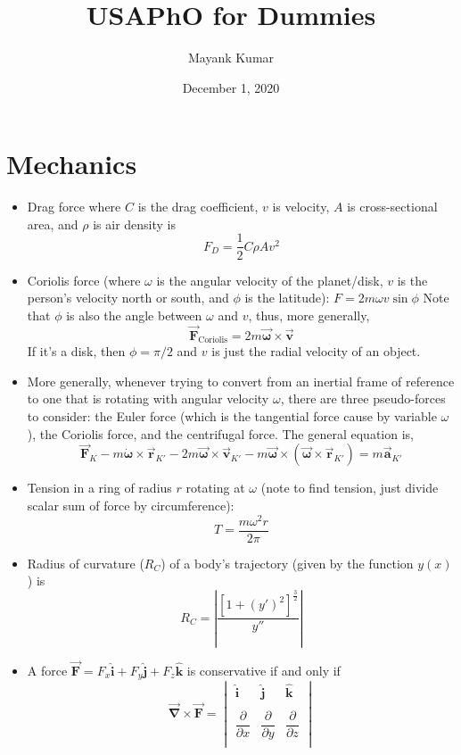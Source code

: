 \documentclass{scrartcl}
\title{USAPhO for Dummies}
\author{Mayank Kumar}
\date{December 1, 2020}
\begin{document}
    \maketitle
    \section{Mechanics}
    \begin{itemize}
        \item Drag force where $C$ is the drag coefficient, $v$ is velocity, $A$ is cross-sectional area, and $\rho$ is air density is \[F_D=\frac 12C\rho Av^2\]
        \item Coriolis force (where $\omega$ is the angular velocity of the planet/disk, $v$ is the person's velocity north or south, and $\phi$ is the latitude): $\boxed{F=2m\omega v\sin\phi}$ Note that $\phi$ is also the angle between $\omega$ and $v$, thus, more generally, \[\vec{\mathbf F}_\text{Coriolis}=2m\vec{\mathbf \omega}\times\vec{\mathbf v}\] If it's a disk, then $\phi=\pi/2$ and $v$ is just the radial velocity of an object.
        \item More generally, whenever trying to convert from an inertial frame of reference to one that is rotating with angular velocity $\omega$, there are three pseudo-forces to consider: the Euler force (which is the tangential force cause by variable $\omega$), the Coriolis force, and the centrifugal force. The general equation is, \[\vec{\mathbf F}_K-m\dot{\mathbf{\omega}}\times\vec{\mathbf r}_{K'}-2m\vec{\mathbf \omega}\times\vec{\mathbf v}_{K'}-m\vec{\mathbf \omega}\times\left(\vec{\mathbf \omega}\times\vec{\mathbf r}_{K'}\right)=m\vec{\mathbf a}_{K'}\]
        \item Tension in a ring of radius $r$ rotating at $\omega$ (note to find tension, just divide scalar sum of force by circumference): \[T=\frac{m\omega^2 r}{2\pi}\]
        \item Radius of curvature ($R_C$) of a body's trajectory (given by the function $y(x)$) is \[R_C=\left|\frac{\left[1+\left(y'\right)^2\right]^{\frac32}}{y''}\right|\]
        \item A force $\vec{\mathbf F}=F_x\mathbf{\hat i}+F_y\mathbf{\hat j}+F_z\mathbf{\hat k}$  is conservative if and only if
        \[\vec{\mathbf \nabla}\times\vec{\mathbf F}=\begin{vmatrix}
            \mathbf{\hat i} & \mathbf{\hat j} & \mathbf{\hat k} \\
            \\\dfrac{\partial}{\partial x} & \dfrac{\partial}{\partial y} & \dfrac{\partial}{\partial z}\\

\end{vmatrix}\]
\end{itemize}
\end{document}
